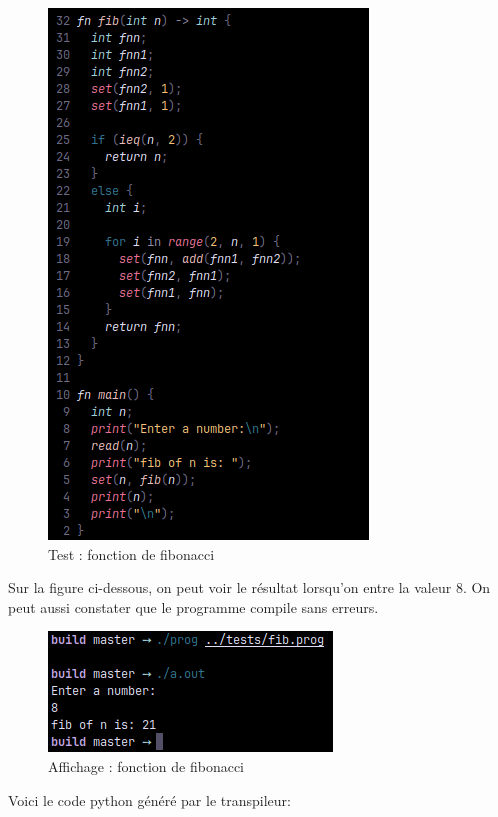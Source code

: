 \documentclass[a4paper]{article}%
\begin{document}
\clearpage
\begin{figure}[h]
  \begin{center}
  \includegraphics[scale=0.7]{./img/fib-prog.png}
  \caption{Test : fonction de fibonacci}
  \end{center}
\end{figure}

Sur la figure ci-dessous, on peut voir le résultat lorsqu'on entre la valeur 8.
On peut aussi constater que le programme compile sans erreurs.

\begin{figure}[h]
  \begin{center}
  \includegraphics[scale=0.7]{./img/fib-prog-out.png}
  \caption{Affichage : fonction de fibonacci}
  \end{center}
\end{figure}

\clearpage
Voici le code python généré par le transpileur:
\end{document}
